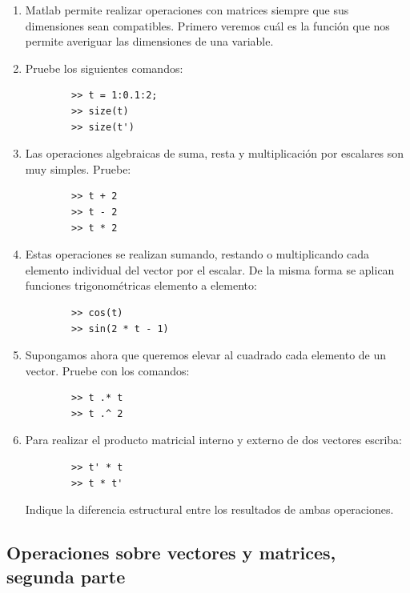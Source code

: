 \begin{enumerate}
	\item Matlab permite realizar operaciones con matrices siempre que sus dimensiones sean compatibles. Primero veremos cuál es la función que nos permite averiguar las dimensiones de una variable.
	\item Pruebe los siguientes comandos:
	\begin{verbatim}
		>> t = 1:0.1:2;
		>> size(t)
		>> size(t')
	\end{verbatim}
	
	\item Las operaciones algebraicas de suma, resta y multiplicación por escalares son muy simples. Pruebe:
	\begin{verbatim}
		>> t + 2
		>> t - 2
		>> t * 2
	\end{verbatim}
	
	\item Estas operaciones se realizan sumando, restando o multiplicando cada elemento individual del vector por el escalar. De la misma forma se aplican funciones trigonométricas elemento a elemento:
	\begin{verbatim}
		>> cos(t)
		>> sin(2 * t - 1)
	\end{verbatim}
	
	\item Supongamos ahora que queremos elevar al cuadrado cada elemento de un vector. Pruebe con los comandos:
	\begin{verbatim}
		>> t .* t
		>> t .^ 2
	\end{verbatim}
	
	\item Para realizar el producto matricial interno y externo de dos vectores escriba:
	\begin{verbatim}
		>> t' * t
		>> t * t'
	\end{verbatim}
	Indique la diferencia estructural entre los resultados de ambas operaciones.
\end{enumerate}

\subsection{Operaciones sobre vectores y matrices, segunda parte}

